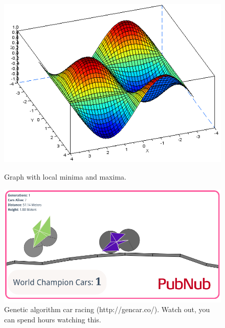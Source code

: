\documentclass[11pt]{article}
\begin{document}
\begin{figure}
  \centering
  \includegraphics{plot3d}
  \label{fig:siman}
  \caption{Graph with local minima and maxima.}
\end{figure}

\begin{algorithm}[h]
\begin{algorithmic}[1]
    
  \EndIf{}
  \EndProcedure{}
\end{algorithmic}

\end{algorithm}




\begin{figure}
  \centering
  \includegraphics[width=\textwidth]{genetic}
  \caption{Genetic algorithm car racing  (http://gencar.co/). Watch out, you can spend hours watching this. }
\end{figure}

\end{document}
